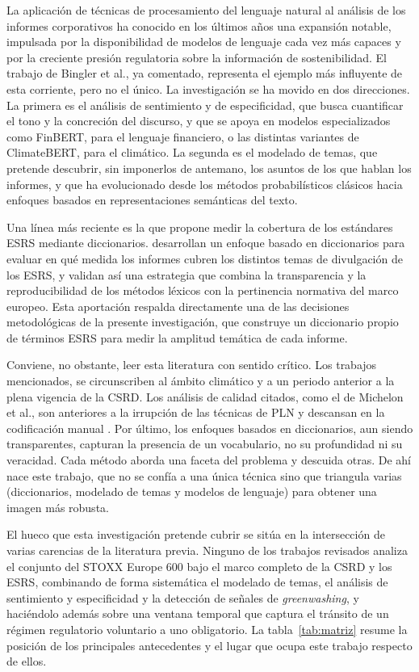 La aplicación de técnicas de procesamiento del lenguaje natural al análisis de los informes
corporativos ha conocido en los últimos años una expansión notable, impulsada por la
disponibilidad de modelos de lenguaje cada vez más capaces y por la creciente presión
regulatoria sobre la información de sostenibilidad. El trabajo de Bingler et al., ya
comentado, representa el ejemplo más influyente de esta corriente, pero no el único. La
investigación se ha movido en dos direcciones. La primera es el
análisis de sentimiento y de especificidad, que busca cuantificar el tono y la concreción del
discurso, y que se apoya en modelos especializados como FinBERT, para el lenguaje financiero,
o las distintas variantes de ClimateBERT, para el climático. La segunda es el modelado de
temas, que pretende descubrir, sin imponerlos de antemano, los asuntos de los que hablan los
informes, y que ha evolucionado desde los métodos probabilísticos clásicos hacia enfoques
basados en representaciones semánticas del texto.

Una línea más reciente es la que propone medir
la cobertura de los estándares ESRS mediante diccionarios. \textcite{suta2025} desarrollan un
enfoque basado en diccionarios para evaluar en qué medida los informes cubren los distintos
temas de divulgación de los ESRS, y validan así una estrategia que combina la transparencia y
la reproducibilidad de los métodos léxicos con la pertinencia normativa del marco europeo.
Esta aportación respalda directamente una de las decisiones metodológicas de la presente
investigación, que construye un diccionario propio de términos ESRS para medir la amplitud
temática de cada informe.

Conviene, no obstante, leer esta literatura con sentido crítico. Los trabajos mencionados, se circunscriben al ámbito climático y a un periodo anterior a la
plena vigencia de la CSRD. Los análisis de calidad citados, como el de Michelon et al., son anteriores a la irrupción de las técnicas de PLN y descansan en la
codificación manual . Por último, los enfoques basados en diccionarios, aun siendo transparentes,
capturan la presencia de un vocabulario, no su profundidad ni su veracidad. Cada método aborda
una faceta del problema y descuida otras. De ahí nace este trabajo, que no se confía a una única técnica 
sino que triangula varias (diccionarios,
modelado de temas y modelos de lenguaje) para obtener una imagen más robusta.

El hueco que esta investigación pretende cubrir se sitúa en la intersección de varias
carencias de la literatura previa. Ninguno de los trabajos revisados analiza el conjunto del
STOXX Europe 600 bajo el marco completo de la CSRD y los ESRS, combinando de forma sistemática el
modelado de temas, el análisis de sentimiento y especificidad y la detección de señales de
\textit{greenwashing}, y haciéndolo además sobre una ventana temporal que captura el tránsito
de un régimen regulatorio voluntario a uno obligatorio. La tabla~\ref{tab:matriz} resume la
posición de los principales antecedentes y el lugar que ocupa este trabajo respecto de ellos.

